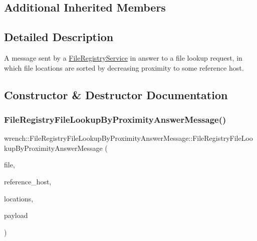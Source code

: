 \subsection*{Additional Inherited Members}


\subsection{Detailed Description}
A message sent by a \hyperlink{classwrench_1_1_file_registry_service}{File\+Registry\+Service} in answer to a file lookup request, in which file locations are sorted by decreasing proximity to some reference host. 

\subsection{Constructor \& Destructor Documentation}
\mbox{\label{classwrench_1_1_file_registry_file_lookup_by_proximity_answer_message_adf913dc2c9cbc469a5cd57f149259a77}} 
\subsubsection{\texorpdfstring{File\+Registry\+File\+Lookup\+By\+Proximity\+Answer\+Message()}{FileRegistryFileLookupByProximityAnswerMessage()}}
{\footnotesize\ttfamily wrench\+::\+File\+Registry\+File\+Lookup\+By\+Proximity\+Answer\+Message\+::\+File\+Registry\+File\+Lookup\+By\+Proximity\+Answer\+Message (\begin{DoxyParamCaption}\item[{\hyperlink{classwrench_1_1_workflow_file}{Workflow\+File} $\ast$}]{file,  }\item[{std\+::string}]{reference\+\_\+host,  }\item[{std\+::map$<$ double, \hyperlink{classwrench_1_1_storage_service}{Storage\+Service} $\ast$$>$}]{locations,  }\item[{double}]{payload }\end{DoxyParamCaption})}



